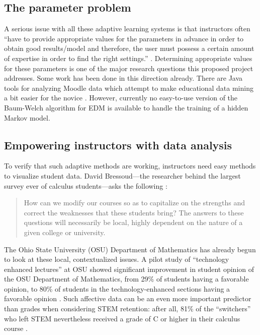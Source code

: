 \documentclass[12pt]{article}
\begin{document}
\subsection{The parameter problem}

A serious issue with all these adaptive learning systems is that
instructors often ``have to provide appropriate values for the
parameters in advance in order to obtain good results/model and
therefore, the user must possess a certain amount of expertise in
order to find the right settings.'' \parencite{romero2010educational}.
Determining appropriate values for these parameters is one of the
major research questions this proposed project addresses.  Some work
has been done in this direction already. There are Java tools for
analyzing Moodle data which attempt to make educational data mining a
bit easier for the novice \parencite{java-data-mining}. However,
currently no easy-to-use version of the Baum-Welch algorithm for EDM
is available to handle the training of a hidden Markov model.

\subsection{Empowering instructors with data analysis}

To verify that such adaptive methods are working, instructors need
easy methods to visualize student data.  David Bressoud---the
researcher behind the largest survey ever of calculus students---asks
the following \parencite{bressoud-sky-falling}:
\begin{quote}
  How can we modify our courses so as to capitalize on the strengths
  and correct the weaknesses that these students bring?  The answers
  to these questions will necessarily be local, highly dependent on
  the nature of a given college or university.
\end{quote}
The Ohio State University (OSU) Department of Mathematics has already
begun to look at these local, contextualized issues.  A pilot study of
``technology enhanced lectures'' at OSU showed significant improvement
in student opinion of the OSU Department of Mathematics, from 29\% of
students having a favorable opinion, to 80\% of students in the
technology-enhanced sections having a favorable opinion
\cite{miller-tech-enhanced-calculus}.  Such affective data can be an
even more important predictor than grades when considering STEM
retention: after all, 81\% of the ``switchers'' who left STEM
nevertheless received a grade of C or higher in their calculus course
\cite{calculus-programs}.
\end{document}
